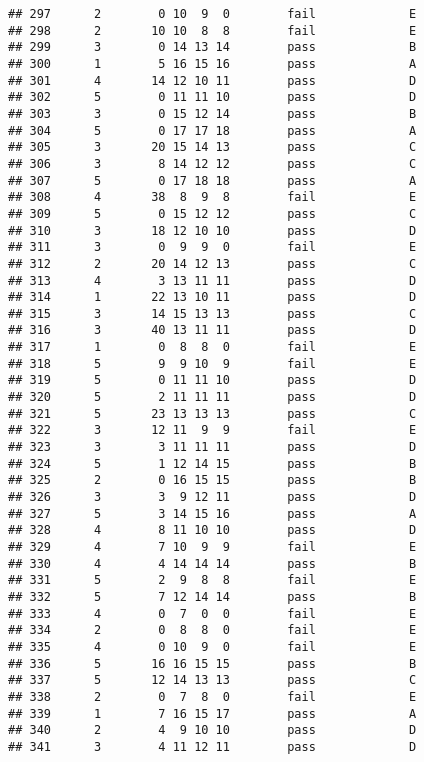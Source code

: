 \documentclass[
]{article}
\begin{document}
\begin{verbatim}
## 297      2        0 10  9  0        fail             E
## 298      2       10 10  8  8        fail             E
## 299      3        0 14 13 14        pass             B
## 300      1        5 16 15 16        pass             A
## 301      4       14 12 10 11        pass             D
## 302      5        0 11 11 10        pass             D
## 303      3        0 15 12 14        pass             B
## 304      5        0 17 17 18        pass             A
## 305      3       20 15 14 13        pass             C
## 306      3        8 14 12 12        pass             C
## 307      5        0 17 18 18        pass             A
## 308      4       38  8  9  8        fail             E
## 309      5        0 15 12 12        pass             C
## 310      3       18 12 10 10        pass             D
## 311      3        0  9  9  0        fail             E
## 312      2       20 14 12 13        pass             C
## 313      4        3 13 11 11        pass             D
## 314      1       22 13 10 11        pass             D
## 315      3       14 15 13 13        pass             C
## 316      3       40 13 11 11        pass             D
## 317      1        0  8  8  0        fail             E
## 318      5        9  9 10  9        fail             E
## 319      5        0 11 11 10        pass             D
## 320      5        2 11 11 11        pass             D
## 321      5       23 13 13 13        pass             C
## 322      3       12 11  9  9        fail             E
## 323      3        3 11 11 11        pass             D
## 324      5        1 12 14 15        pass             B
## 325      2        0 16 15 15        pass             B
## 326      3        3  9 12 11        pass             D
## 327      5        3 14 15 16        pass             A
## 328      4        8 11 10 10        pass             D
## 329      4        7 10  9  9        fail             E
## 330      4        4 14 14 14        pass             B
## 331      5        2  9  8  8        fail             E
## 332      5        7 12 14 14        pass             B
## 333      4        0  7  0  0        fail             E
## 334      2        0  8  8  0        fail             E
## 335      4        0 10  9  0        fail             E
## 336      5       16 16 15 15        pass             B
## 337      5       12 14 13 13        pass             C
## 338      2        0  7  8  0        fail             E
## 339      1        7 16 15 17        pass             A
## 340      2        4  9 10 10        pass             D
## 341      3        4 11 12 11        pass             D

\end{verbatim}
\end{document}
